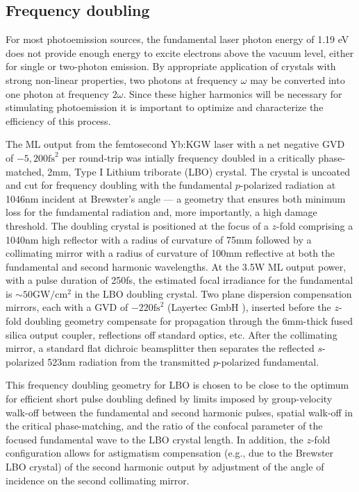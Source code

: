 \subsection{Frequency doubling}

For most photoemission sources, the fundamental laser photon energy of 1.19 eV does not provide enough energy to excite electrons above the vacuum level, either for single or two-photon emission.\cite{eastman_photoelectric_1970,johnson_optical_1972,dowell_quantum_2009}
By appropriate application of crystals with strong non-linear properties, two photons at frequency $\omega$ may be converted into one photon at frequency $2 \omega$.\cite{shen_principles_2002}
Since these higher harmonics will be necessary for stimulating photoemission it is important to optimize and characterize the efficiency of this process.

The ML output from the femtosecond Yb:KGW laser with a net negative GVD of $-5,200\text{fs}^2$ per round-trip was intially frequency doubled in a critically phase-matched, 2mm, Type I Lithium triborate (LBO) crystal.
The crystal is uncoated and cut for frequency doubling with the fundamental $p$-polarized radiation at 1046nm incident at Brewster's angle --- a geometry that ensures both minimum loss for the fundamental radiation and, more importantly, a high damage threshold.
The doubling crystal is positioned at the focus of a $z$-fold comprising a 1040nm high reflector with a radius of curvature of 75mm followed by a collimating mirror with a radius of curvature of 100mm reflective at both the fundamental and second harmonic wavelengths.
At the 3.5W ML output power, with a pulse duration of 250fs, the estimated focal irradiance for the fundamental is $\sim50\text{GW}/\text{cm}^2$ in the LBO doubling crystal.
Two plane dispersion compensation mirrors, each with a GVD of $-220\text{fs}^2$ (Layertec GmbH \cite{website_layertec}), inserted before the $z$-fold doubling geometry compensate for propagation through the 6mm-thick fused silica output coupler, reflections off standard optics, etc.
After the collimating
mirror, a standard flat dichroic beamsplitter then separates the reflected $s$-polarized 523nm radiation from the transmitted $p$-polarized fundamental.

This frequency doubling geometry for LBO is chosen to be close to the optimum for efficient short pulse doubling \cite{wang_efficiency_2003,Saltiel_second_harmonic_2004} defined by limits imposed by group-velocity walk-off between the fundamental and second harmonic pulses, spatial walk-off in the critical phase-matching, and the ratio of the confocal parameter of the focused fundamental wave to the LBO crystal length.
In addition, the $z$-fold configuration allows for astigmatism compensation (e.g., due to the Brewster LBO crystal) of the second harmonic output by adjustment of the angle of incidence on the second collimating mirror.

